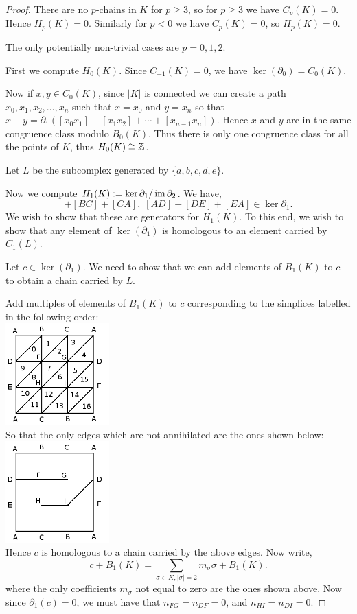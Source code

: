 \documentclass{unswmaths}
\begin{document}
\begin{proof}
There are no $p$-chains in $K$ for $p \geq 3$, so for $p \geq 3$ we have $C_p(K) = 0$. 
Hence $H_p(K) = 0$. Similarly for $p < 0$ we have $C_p(K) = 0$, so $H_p(K) = 0$.

The only potentially non-trivial cases are $p = 0,1,2$.

First we compute $H_0(K)$. Since $C_{-1}(K) = 0$, we have $\ker(\partial_0) = C_0(K)$. 

Now if $x,y \in C_0(K)$, since $|K|$ is connected we can create a path $x_0,x_1,x_2,\ldots,x_n$
such that $x = x_0$ and $y = x_n$ so that $x-y = \partial_1([x_0x_1]+[x_1x_2]+\cdots+[x_{n-1}x_n])$.
Hence $x$ and $y$ are in the same congruence class modulo $B_0(K)$. Thus
there is only one congruence class for all the points of $K$, thus
$H_0(K) \cong \mathbb{Z}$.

Let $L$ be the subcomplex
generated by $\{a,b,c,d,e\}$.

Now we compute $H_1(K):= \ker\partial_1/\operatorname{im}\partial_2$. We have,
\begin{equation*}
    [AB]+[BC]+[CA],\;[AD]+[DE]+[EA] \in \ker\partial_1.
\end{equation*}
We wish to show that these are generators for $H_1(K)$. 
To this end, we wish to show that any element of $\ker(\partial_1)$
is homologous to an element carried by $C_1(L)$. 

Let $c \in \ker(\partial_1)$. We need to show that we can add
elements of $B_1(K)$ to $c$ to obtain a chain carried by $L$.

Add multiples of elements of $B_1(K)$ to $c$ corresponding to the simplices
labelled in the following order:\\
\includegraphics[width=40mm]{klein4.png}\\
So that the only edges which are not annihilated are the ones shown below:\\
\includegraphics[width=40mm]{klein5.png}\\
Hence $c$ is homologous to a chain carried by the above edges. Now write,
\begin{equation*}
    c+B_1(K) = \sum_{\sigma \in K,|\sigma| = 2} m_\sigma \sigma + B_1(K).
\end{equation*}
where the only coefficients $m_\sigma$ not equal to zero are the ones shown above.
Now since $\partial_1(c) = 0$, we must have that $n_{FG} = n_{DF} = 0$,
and $n_{HI} = n_{DI} = 0$. 


\end{proof}
\end{document}
